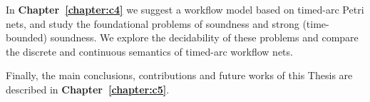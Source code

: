In \textbf{Chapter~\ref{chapter:c4}} we suggest a workflow model based on timed-arc Petri nets, and study
the foundational problems of soundness and strong (time-bounded) soundness.
We explore the decidability of these problems
and compare the discrete and continuous semantics of timed-arc
workflow nets. 

Finally, the main conclusions, contributions and future works of this Thesis are described in \textbf{Chapter~\ref{chapter:c5}}.